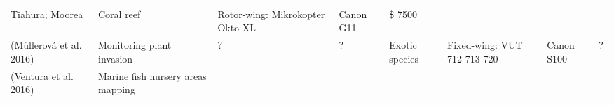 \documentclass[]{interact}
\theoremstyle{plain}%
\theoremstyle{definition}
\theoremstyle{remark}
\begin{document}
\begin{longtable}[]{@{}llllllll@{}}
\begin{minipage}[t]{0.14\columnwidth}
Tiahura; Moorea\strut
\end{minipage} & \begin{minipage}[t]{0.10\columnwidth}\raggedright\strut
Coral reef\strut
\end{minipage} & \begin{minipage}[t]{0.09\columnwidth}\raggedright\strut
Rotor-wing: Mikrokopter Okto XL\strut
\end{minipage} & \begin{minipage}[t]{0.11\columnwidth}\raggedright\strut
Canon G11\strut
\end{minipage} & \begin{minipage}[t]{0.01\columnwidth}\raggedright\strut
\$ 7500\strut
\end{minipage}\tabularnewline
\begin{minipage}[t]{0.11\columnwidth}\raggedright\strut
(Müllerová et al. 2016)\strut
\end{minipage} & \begin{minipage}[t]{0.18\columnwidth}\raggedright\strut
Monitoring plant invasion\strut
\end{minipage} & \begin{minipage}[t]{0.03\columnwidth}\raggedright\strut
?\strut
\end{minipage} & \begin{minipage}[t]{0.14\columnwidth}\raggedright\strut
?\strut
\end{minipage} & \begin{minipage}[t]{0.10\columnwidth}\raggedright\strut
Exotic species\strut
\end{minipage} & \begin{minipage}[t]{0.09\columnwidth}\raggedright\strut
Fixed-wing: VUT 712 713 720\strut
\end{minipage} & \begin{minipage}[t]{0.11\columnwidth}\raggedright\strut
Canon S100\strut
\end{minipage} & \begin{minipage}[t]{0.01\columnwidth}\raggedright\strut
?\strut
\end{minipage}\tabularnewline
\begin{minipage}[t]{0.11\columnwidth}\raggedright\strut
(Ventura et al. 2016)\strut
\end{minipage} & \begin{minipage}[t]{0.18\columnwidth}\raggedright\strut
Marine fish nursery areas mapping\strut
\end{minipage} & \begin{minipage}[t]{0.03\columnwidth}\raggedright\strut

\end{minipage}
\end{longtable}
\end{document}
